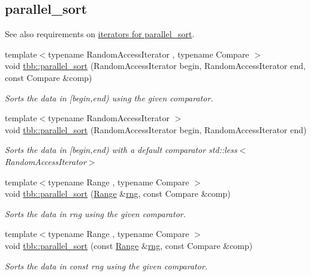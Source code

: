 \subsection*{parallel\+\_\+sort}
\label{_amgrp507087c4dcfb051fe7d24227c3a34024}%
See also requirements on \hyperlink{parallel_sort_iter_req}{iterators for parallel\+\_\+sort}. \begin{DoxyCompactItemize}
\item 
{\footnotesize template$<$typename Random\+Access\+Iterator , typename Compare $>$ }\\void \hyperlink{group__algorithms_gabdc90813499f91d3e32298cd6dc2fe45}{tbb\+::parallel\+\_\+sort} (Random\+Access\+Iterator begin, Random\+Access\+Iterator end, const Compare \&comp)
\begin{DoxyCompactList}\small\item\em Sorts the data in \mbox{[}begin,end) using the given comparator. \end{DoxyCompactList}\item 
{\footnotesize template$<$typename Random\+Access\+Iterator $>$ }\\void \hyperlink{group__algorithms_ga73b58ac9249f49587d0b081c152af551}{tbb\+::parallel\+\_\+sort} (Random\+Access\+Iterator begin, Random\+Access\+Iterator end)
\begin{DoxyCompactList}\small\item\em Sorts the data in \mbox{[}begin,end) with a default comparator {\ttfamily std\+::less$<$\+Random\+Access\+Iterator$>$} \end{DoxyCompactList}\item 
{\footnotesize template$<$typename Range , typename Compare $>$ }\\void \hyperlink{group__algorithms_ga61ce8ba64868c5c15f9d98840193b9bf}{tbb\+::parallel\+\_\+sort} (\hyperlink{classtbb_1_1blocked__range}{Range} \&\hyperlink{structrng}{rng}, const Compare \&comp)
\begin{DoxyCompactList}\small\item\em Sorts the data in rng using the given comparator. \end{DoxyCompactList}\item 
{\footnotesize template$<$typename Range , typename Compare $>$ }\\void \hyperlink{group__algorithms_ga541b2fd91e88842a7b823161107779e9}{tbb\+::parallel\+\_\+sort} (const \hyperlink{classtbb_1_1blocked__range}{Range} \&\hyperlink{structrng}{rng}, const Compare \&comp)
\begin{DoxyCompactList}\small\item\em Sorts the data in const rng using the given comparator. \end{DoxyCompactList}\item 

\end{DoxyCompactItemize}
